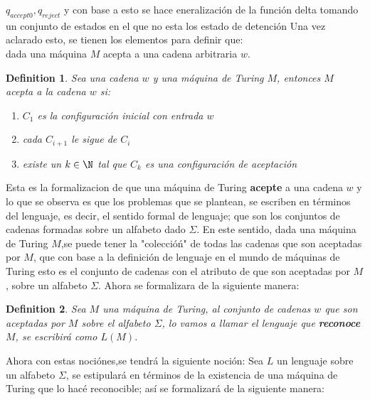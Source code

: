 \documentclass[10pt]{report}
\newtheorem{definition}{Definition}
\begin{document}
    $q_{accept0},q_{reject}$ y con base a esto se hace eneralización de la función delta tomando
    un conjunto de estados en el que no esta los estado de detención
    \newline
    Una vez aclarado esto, se tienen los elementos para definir que:\\
    dada una máquina $M$ acepta a una
    cadena arbitraria $w$.
    \begin{definition}
        Sea una cadena $w$ y una máquina de Turing $M$,\newline
        entonces $M$ acepta a la cadena $w$ si:
        \begin{enumerate}
            \item $C_{1}$ es la configuración inicial con entrada $w$
            \item cada $C_{i+1}$ le sigue de $C_{i}$
            \item existe un $k \in \N$ tal que $C_{k}$ es una configuración de aceptación
        \end{enumerate}
    \end{definition}
    Esta es la formalizacion de que una máquina de Turing \textbf{acepte} a una cadena $w$
    y lo que se observa es que los problemas que se plantean, se
    escriben en términos del lenguaje, es decir, el sentido formal de lenguaje; que son los
    conjuntos de cadenas formadas sobre un alfabeto dado $\Sigma$.
    \newpage
    En este sentido, dada una máquina de Turing $M$,se puede tener la "coleccióń" de todas
    las cadenas que son aceptadas por $M$, que con base a la definición de lenguaje en el mundo de máquinas de Turing
    esto es el conjunto de cadenas con el atributo de que son aceptadas por $M$, sobre un alfabeto $\Sigma$.
    \newline
    Ahora se formalizara de la siguiente manera:
    \begin{definition}
        Sea $M$ una máquina de Turing, al conjunto de cadenas $w$ que son aceptadas por $M$ sobre el alfabeto $\Sigma$,
        lo vamos a llamar el lenguaje que \textbf{reconoce} $M$, se escribirá como $L(M)$.

    \end{definition}

    Ahora con estas nociónes,se tendrá la siguiente noción: \newline Sea $L$ un lenguaje sobre un alfabeto $\Sigma$,
    se estipulará en términos de la existencia de una máquina de Turing que lo hacé reconocible;
    así se formalizará de la siguiente manera: \newline
\end{document}
